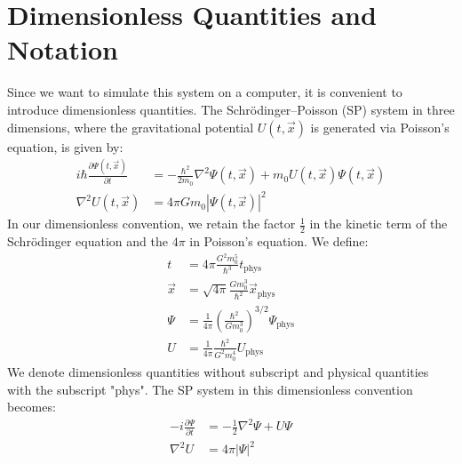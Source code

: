 \documentclass[12pt]{article}
\begin{document}
\section*{Dimensionless Quantities and Notation}
Since we want to simulate this system on a computer, it is convenient to introduce dimensionless quantities. The Schrödinger–Poisson (SP) system in three dimensions, where the gravitational potential \( U(t,\vec{x}) \) is generated via Poisson's equation, is given by:
\begin{align}
    i\hbar \frac{\partial \Psi(t,\vec{x})}{\partial t}&=-\frac{\hbar^2}{2m_0}\nabla^{2}\Psi(t,\vec{x})+m_0 U(t,\vec{x}) \Psi(t,\vec{x}) \\
    \nabla^{2} U(t,\vec{x})&=4\pi G m_0 |\Psi(t,\vec{x})|^2
\end{align}
In our dimensionless convention, we retain the factor \( \frac{1}{2} \) in the kinetic term of the Schrödinger equation and the \( 4\pi \) in Poisson’s equation. We define:
\begin{align}
    t&=4\pi \frac{G^2 m_0^{5}}{\hbar^3}t_{\text{phys}} \\
    \vec{x}&=\sqrt{4\pi}\frac{G m_{0}^{3}}{\hbar^2}\vec{x}_{\text{phys}} \\
    \Psi&=\frac{1}{4\pi}\left(\frac{\hbar^2}{Gm_0^{3}} \right)^{3/2} \Psi_{\text{phys}} \\
    U&=\frac{1}{4\pi}\frac{\hbar^2}{G^{2}m_0^{4}}U_{\text{phys}}
\end{align}
We denote dimensionless quantities without subscript and physical quantities with the subscript "phys". The SP system in this dimensionless convention becomes:
\begin{align}
    -i\frac{\partial \Psi}{\partial t}&=-\frac{1}{2}\nabla^2 \Psi+U\Psi \\
    \nabla^2 U&=4\pi |\Psi|^2
\end{align}
\end{document}
